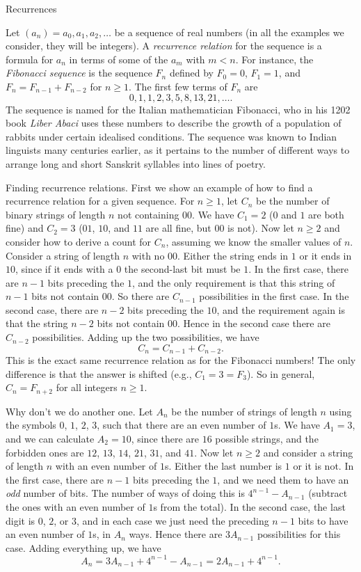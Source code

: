 \advsect Recurrences

Let $(a_n) = a_0, a_1, a_2, \ldots$ be a sequence of real numbers (in all
the examples we consider, they will be integers). A {\it recurrence relation}
for the sequence is a formula for $a_n$ in terms of some of the $a_m$ with $m<n$.
For instance, the {\it Fibonacci sequence} is the sequence $F_n$ defined by $F_0 = 0$,
$F_1 = 1$, and $F_n = F_{n-1} + F_{n-2}$ for $n\ge 1$. The first few terms of $F_n$ are
$$ 0 , 1, 1, 2, 3, 5, 8, 13, 21, \ldots.$$
The sequence is named for the Italian mathematician Fibonacci, who in his 1202 book {\sl Liber Abaci}
uses these numbers to describe the growth of a population of rabbits under certain idealised
conditions. The sequence was known to Indian linguists many centuries earlier, as it pertains
to the number of different ways to arrange long and short Sanskrit syllables into lines of poetry.
\bye

\medskip\boldlabel Finding recurrence relations.
First we show an example of how to find a recurrence relation for a given sequence.
For $n\ge 1$, let $C_n$ be the number of binary strings of length $n$ not containing $00$.
We have $C_1 = 2$ ($0$ and $1$ are both fine) and $C_2 = 3$ ($01$, $10$, and $11$ are all fine,
but $00$ is not).
Now let $n\ge 2$ and consider how to derive a count for $C_n$, assuming
we know the smaller values of $n$. Consider a string of length $n$ with no $00$.
Either the string ends in $1$ or it ends in $10$, since if it ends with a $0$ the second-last
bit must be $1$. In the first case, there are $n-1$ bits preceding the $1$, and the only requirement
is that this string of $n-1$ bits not contain $00$. So there are $C_{n-1}$ possibilities in the
first case. In the second case, there are $n-2$ bits preceding the $10$, and the requirement
again is that the string $n-2$ bits not contain $00$. Hence in the second case there are
$C_{n-2}$ possibilities. Adding up the two possibilities, we have
$$C_n = C_{n-1} + C_{n-2}.$$
This is the exact same recurrence relation as for the Fibonacci numbers! The only difference
is that the answer is shifted (e.g., $C_1 = 3 = F_3$). So in general, $C_n = F_{n+2}$
for all integers $n\ge 1$.

Why don't we do another one. Let $A_n$ be the number of strings of length $n$ using the symbols
$0$, $1$, $2$, $3$, such that there are an even number of $1$s. We have $A_1 = 3$, and
we can calculate $A_2 = 10$, since there are $16$ possible strings, and the forbidden
ones are $12$, $13$, $14$, $21$, $31$, and $41$. Now let $n\ge 2$ and consider a
string of length $n$ with an even number of $1$s. Either the last number is $1$ or it is not.
In the first case, there are $n-1$ bits preceding the $1$, and we need them to have an {\it odd}
number of bits. The number of ways of doing this is $4^{n-1} - A_{n-1}$ (subtract the
ones with an even number of $1$s from the total). In the second case, the last digit
is $0$, $2$, or $3$, and in each case we just need the preceding $n-1$ bits to have an even
number of $1$s, in $A_n$ ways. Hence there are $3A_{n-1}$ possibilities for this case.
Adding everything up, we have
$$A_n = 3A_{n-1} + 4^{n-1} - A_{n-1} = 2A_{n-1} + 4^{n-1}.$$

